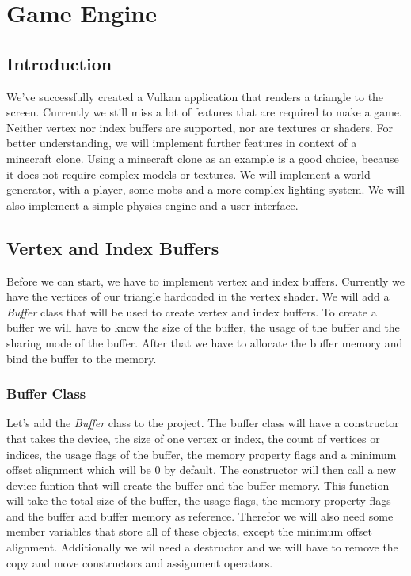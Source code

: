 \documentclass[12pt]{report} \usepackage{preamble}
\begin{document}
\chapter{Game Engine}

\section{Introduction}

We've successfully created a Vulkan application that renders a triangle to the screen. Currently we still miss a lot of features that are
required to make a game. Neither vertex nor index buffers are supported, nor are textures or shaders. For better understanding, we will implement
further features in context of a minecraft clone. Using a minecraft clone as an example is a good choice, because it does not require complex
models or textures. We will implement a world generator, with a player, some mobs and a more complex lighting system. We will also implement
a simple physics engine and a user interface.

\section{Vertex and Index Buffers}

Before we can start, we have to implement vertex and index buffers. Currently we have the vertices of our triangle hardcoded in the vertex shader.
We will add a \textit{Buffer} class that will be used to create vertex and index buffers. To create a buffer we will have to know the size of the buffer,
the usage of the buffer and the sharing mode of the buffer. After that we have to allocate the buffer memory and bind the buffer to the memory.

\subsection{Buffer Class}

Let's add the \textit{Buffer} class to the project. The buffer class will have a constructor that takes the device, the size of one vertex or index, the count of vertices or indices,
the usage flags of the buffer, the memory property flags and a minimum offset alignment which will be 0 by default. The constructor will then call a new device funtion that will create the buffer and the buffer memory.
This function will take the total size of the buffer, the usage flags, the memory property flags and the buffer and buffer memory as reference. Therefor we will also need some member variables
that store all of these objects, except the minimum offset alignment. Additionally we wil need a destructor and we will have to remove the copy and move constructors and assignment operators.
\end{document}
